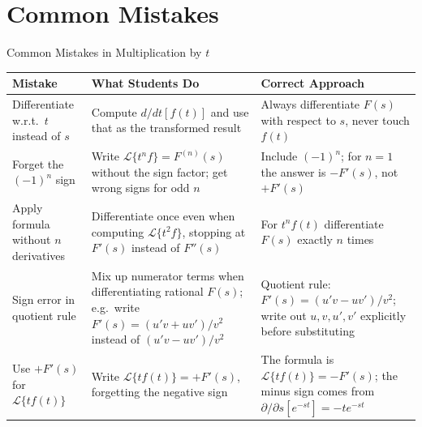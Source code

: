 \documentclass[12pt,a4paper]{article}
\begin{document}
\section{Common Mistakes}
\begin{mistakebox}{Common Mistakes in Multiplication by $t$}
\begin{tabular}{@{}p{4cm} p{5cm} p{5cm}@{}}
\toprule
\textbf{Mistake} & \textbf{What Students Do} & \textbf{Correct Approach} \\
\midrule
Differentiate w.r.t.\ $t$ instead of $s$ &
  Compute $d/dt[f(t)]$ and use that as the transformed result &
  Always differentiate $F(s)$ with respect to $s$, never touch $f(t)$ \\
Forget the $(-1)^n$ sign &
  Write $\mathcal{L}\{t^n f\} = F^{(n)}(s)$ without the sign factor;
  get wrong signs for odd $n$ &
  Include $(-1)^n$; for $n=1$ the answer is $-F'(s)$, not $+F'(s)$ \\
Apply formula without $n$ derivatives &
  Differentiate once even when computing $\mathcal{L}\{t^2 f\}$,
  stopping at $F'(s)$ instead of $F''(s)$ &
  For $t^n f(t)$ differentiate $F(s)$ exactly $n$ times \\
Sign error in quotient rule &
  Mix up numerator terms when differentiating rational $F(s)$;
  e.g.\ write $F'(s) = (u'v + uv')/v^2$ instead of $(u'v - uv')/v^2$ &
  Quotient rule: $F'(s) = (u'v - uv')/v^2$; write out $u,v,u',v'$
  explicitly before substituting \\
Use $+F'(s)$ for $\mathcal{L}\{tf(t)\}$ &
  Write $\mathcal{L}\{tf(t)\} = +F'(s)$, forgetting the negative sign &
  The formula is $\mathcal{L}\{tf(t)\} = -F'(s)$; the minus sign
  comes from $\partial/\partial s[e^{-st}] = -te^{-st}$ \\
\bottomrule
\end{tabular}
\end{mistakebox}

\end{document}
